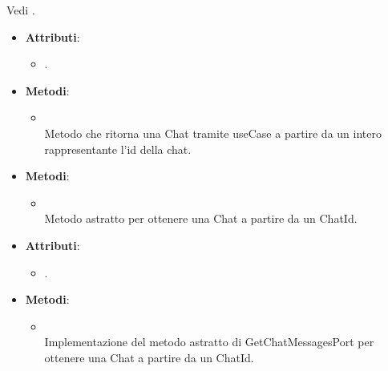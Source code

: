 \documentclass[10pt, a4paper]{article}
\begin{document}
Vedi .

\label{GetChatMessagesControllerDettaglio}
\begin{itemize}
    \item \textbf{Attributi}:
    \begin{itemize}
        \item {}.
    \end{itemize}
    \item \textbf{Metodi}:
    \begin{itemize}
        \item {}\\
        Metodo che ritorna una Chat tramite useCase a partire da un intero rappresentante l'id della chat. 
    \end{itemize}
\end{itemize}


\label{GetChatMessagesPortDettaglio}
\begin{itemize}
    \item \textbf{Metodi}:
    \begin{itemize}
        \item {}\\
        Metodo astratto per ottenere una Chat a partire da un ChatId.
    \end{itemize}
\end{itemize}


\label{GetChatMessagesPostgresDettaglio}
\begin{itemize}
    \item \textbf{Attributi}:
    \begin{itemize}
        \item {}.
    \end{itemize}
    \item \textbf{Metodi}:
    \begin{itemize}
        \item {}\\
        Implementazione del metodo astratto di GetChatMessagesPort per ottenere una Chat a partire da un ChatId.
        
    
    \end{itemize}
\end{itemize}
\end{document}
